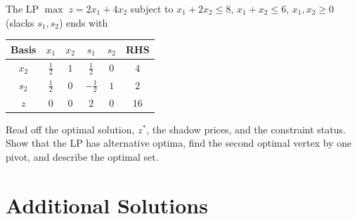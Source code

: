 \begin{problems}
  \item The LP $\max\; z=2x_{1}+4x_{2}$ subject to $x_{1}+2x_{2}\le 8$,
        $x_{1}+x_{2}\le 6$, $x_{1},x_{2}\ge 0$ (slacks $s_{1},s_{2}$)
        ends with
        \begin{center}
        \begin{tabular}{c|cccc|c}
        Basis & $x_{1}$ & $x_{2}$ & $s_{1}$ & $s_{2}$ & RHS\\
        \hline
        $x_{2}$ & $\tfrac{1}{2}$ & $1$ & $\tfrac{1}{2}$ & $0$ & $4$\\
        $s_{2}$ & $\tfrac{1}{2}$ & $0$ & $-\tfrac{1}{2}$ & $1$ & $2$\\
        \hline
        $z$ & $0$ & $0$ & $2$ & $0$ & $16$\\
        \end{tabular}
        \end{center}
        Read off the optimal solution, $z^{*}$, the shadow prices, and the
        constraint status. Show that the LP has alternative optima, find
        the second optimal vertex by one pivot, and describe the optimal
        set.
\end{problems}

\section{Additional Solutions}


